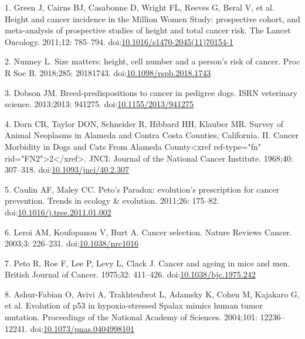 \documentclass[]{elsarticle} %
\begin{document}
\hypertarget{refs}{}
\leavevmode\hypertarget{ref-Green2011}{}%
1. Green J, Cairns BJ, Casabonne D, Wright FL, Reeves G, Beral V, et al.
Height and cancer incidence in the Million Women Study: prospective
cohort, and meta-analysis of prospective studies of height and total
cancer risk. The Lancet Oncology. 2011;12: 785--794.
doi:\href{https://doi.org/10.1016/s1470-2045(11)70154-1}{10.1016/s1470-2045(11)70154-1}

\leavevmode\hypertarget{ref-Nunney:20181c2}{}%
2. Nunney L. Size matters: height, cell number and a person's risk of
cancer. Proc R Soc B. 2018;285: 20181743.
doi:\href{https://doi.org/10.1098/rspb.2018.1743}{10.1098/rspb.2018.1743}

\leavevmode\hypertarget{ref-Dobson2013}{}%
3. Dobson JM. Breed-predispositions to cancer in pedigree dogs. ISRN
veterinary science. 2013;2013: 941275.
doi:\href{https://doi.org/10.1155/2013/941275}{10.1155/2013/941275}

\leavevmode\hypertarget{ref-Dorn1968}{}%
4. Dorn CR, Taylor DON, Schneider R, Hibbard HH, Klauber MR. Survey of
Animal Neoplasms in Alameda and Contra Costa Counties, California. II.
Cancer Morbidity in Dogs and Cats From Alameda County\textless{}xref
ref-type="fn" rid="FN2"\textgreater{}2\textless{}/xref\textgreater{}.
JNCI: Journal of the National Cancer Institute. 1968;40: 307--318.
doi:\href{https://doi.org/10.1093/jnci/40.2.307}{10.1093/jnci/40.2.307}

\leavevmode\hypertarget{ref-Caulin2011}{}%
5. Caulin AF, Maley CC. Peto's Paradox: evolution's prescription for
cancer prevention. Trends in ecology \& evolution. 2011;26: 175--82.
doi:\href{https://doi.org/10.1016/j.tree.2011.01.002}{10.1016/j.tree.2011.01.002}

\leavevmode\hypertarget{ref-Leroi2003}{}%
6. Leroi AM, Koufopanou V, Burt A. Cancer selection. Nature Reviews
Cancer. 2003;3: 226--231.
doi:\href{https://doi.org/10.1038/nrc1016}{10.1038/nrc1016}

\leavevmode\hypertarget{ref-Peto1975}{}%
7. Peto R, Roe F, Lee P, Levy L, Clack J. Cancer and ageing in mice and
men. British Journal of Cancer. 1975;32: 411--426.
doi:\href{https://doi.org/10.1038/bjc.1975.242}{10.1038/bjc.1975.242}

\leavevmode\hypertarget{ref-Ashur-Fabian2004}{}%
8. Ashur-Fabian O, Avivi A, Trakhtenbrot L, Adamsky K, Cohen M, Kajakaro
G, et al. Evolution of p53 in hypoxia-stressed Spalax mimics human tumor
mutation. Proceedings of the National Academy of Sciences. 2004;101:
12236--12241.
doi:\href{https://doi.org/10.1073/pnas.0404998101}{10.1073/pnas.0404998101}
\end{document}
